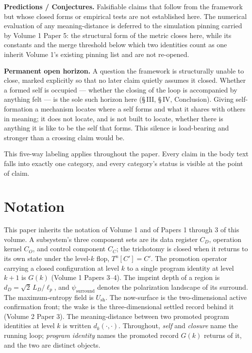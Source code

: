 \documentclass[11pt,oneside]{report}
\theoremstyle{definition}
\theoremstyle{remark}
\begin{document}
\textbf{Predictions / Conjectures.} Falsifiable claims that follow from the
framework but whose closed forms or empirical tests are not established here.
The numerical evaluation of any meaning-distance is deferred to the simulation
pinning carried by Volume 1 Paper 5: the structural form of the metric closes
here, while its constants and the merge threshold below which two identities
count as one inherit Volume 1's existing pinning list and are not re-opened.

\textbf{Permanent open horizon.} A question the framework is structurally unable
to close, marked explicitly so that no later claim quietly assumes it closed.
Whether a formed self is occupied --- whether the closing of the loop is
accompanied by anything felt --- is the sole such horizon here (\S\,III,
\S\,IV, Conclusion). Giving self-formation a mechanism locates where a self
forms and what it shares with others in meaning; it does not locate, and is not
built to locate, whether there is anything it is like to be the self that
forms. This silence is load-bearing and stronger than a crossing claim would
be.

This five-way labeling applies throughout the paper. Every claim in the body
text falls into exactly one category, and every category's status is visible at
the point of claim.

\section*{Notation}

This paper inherits the notation of Volume 1 and of Papers 1 through 3 of this
volume. A subsystem's three component sets are its data register
\ensuremath{C_{D}}, operation kernel \ensuremath{C_{O}}, and control component
\ensuremath{C_{C}}; the trichotomy is closed when it returns to its own state
under the level-\ensuremath{k} flop, \ensuremath{T^{n}[C'] = C'}. The promotion
operator carrying a closed configuration at level \ensuremath{k} to a single
program identity at level \ensuremath{k+1} is \ensuremath{G(k)} (Volume 1 Papers
3--4). The imprint depth of a region is
\ensuremath{d_{D} = \sqrt{2}\,L_{D}/\ell_{p}}, and \ensuremath{\psi_{\mathrm{surround}}}
denotes the polarization landscape of its surround. The maximum-entropy field
is \ensuremath{U_{\mathrm{sh}}}. The now-surface is the two-dimensional active
confirmation front; the wake is the three-dimensional settled record behind it
(Volume 2 Paper 3). The meaning-distance between two promoted program
identities at level \ensuremath{k} is written \ensuremath{d_{k}(\cdot,\cdot)}.
Throughout, \emph{self} and \emph{closure} name the running loop; \emph{program
identity} names the promoted record \ensuremath{G(k)} returns of it, and the two
are distinct objects.
\end{document}

